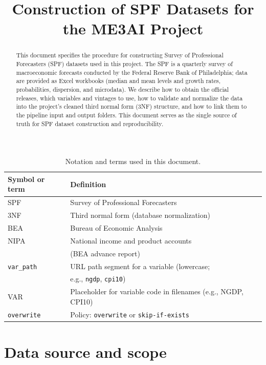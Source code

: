 \documentclass[11pt]{article}
\title{Construction of SPF Datasets for the ME3AI Project}
\date{}
\begin{document}
\maketitle

\begin{abstract}
This document specifies the procedure for constructing Survey of Professional
Forecasters (SPF) datasets used in this project. The SPF is a quarterly survey
of macroeconomic forecasts conducted by the Federal Reserve Bank of
Philadelphia; data are provided as Excel workbooks (median and mean levels and
growth rates, probabilities, dispersion, and microdata). We describe how to
obtain the official releases, which variables and vintages to use, how to
validate and normalize the data into the project's cleaned third normal form
(3NF) structure, and how to link them to the pipeline input and output folders.
This document serves as the single source of truth for SPF dataset construction
and reproducibility.
\end{abstract}

\begin{table}[h]
\centering
\caption{Notation and terms used in this document.}
\label{tab:notation}
\begin{tabular}{@{}ll@{}}
\toprule
Symbol or term & Definition \\
\midrule
SPF & Survey of Professional Forecasters \\
3NF & Third normal form (database normalization) \\
BEA & Bureau of Economic Analysis \\
NIPA & National income and product accounts \\
     & (BEA advance report) \\
\texttt{var\_path} & URL path segment for a variable (lowercase; \\
     & e.g., \texttt{ngdp}, \texttt{cpi10}) \\
VAR & Placeholder for variable code in filenames (e.g., NGDP, CPI10) \\
\texttt{overwrite} & Policy: \texttt{overwrite} or \texttt{skip-if-exists} \\
\bottomrule
\end{tabular}
\end{table}

\section{Data source and scope}
\end{document}
